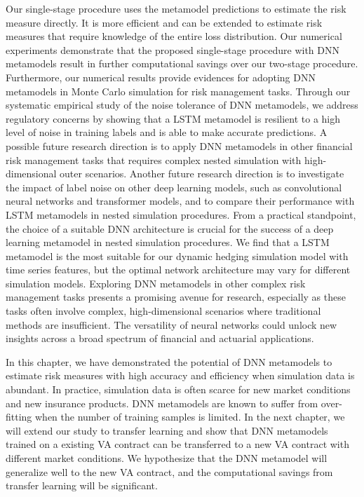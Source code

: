 Our single-stage procedure uses the metamodel predictions to estimate the risk measure directly.
It is more efficient and can be extended to estimate risk measures that require knowledge of the entire loss distribution.
Our numerical experiments demonstrate that the proposed single-stage procedure with DNN metamodels result in further computational savings over our two-stage procedure. 
Furthermore, our numerical results provide evidences for adopting DNN metamodels in Monte Carlo simulation for risk management tasks.
Through our systematic empirical study of the noise tolerance of DNN metamodels, we address regulatory concerns by showing that a LSTM metamodel is resilient to a high level of noise in training labels and is able to make accurate predictions.
A possible future research direction is to apply DNN metamodels in other financial risk management tasks that requires complex nested simulation with high-dimensional outer scenarios.
Another future research direction is to investigate the impact of label noise on other deep learning models, such as convolutional neural networks and transformer models, and to compare their performance with LSTM metamodels in nested simulation procedures. 
From a practical standpoint, the choice of a suitable DNN architecture is crucial for the success of a deep learning metamodel in nested simulation procedures.
We find that a LSTM metamodel is the most suitable for our dynamic hedging simulation model with time series features, but the optimal network architecture may vary for different simulation models.
Exploring DNN metamodels in other complex risk management tasks presents a promising avenue for research, especially as these tasks often involve complex, high-dimensional scenarios where traditional methods are insufficient. 
The versatility of neural networks could unlock new insights across a broad spectrum of financial and actuarial applications.

In this chapter, we have demonstrated the potential of DNN metamodels to estimate risk measures with high accuracy and efficiency when simulation data is abundant.
In practice, simulation data is often scarce for new market conditions and new insurance products.
DNN metamodels are known to suffer from over-fitting when the number of training samples is limited.
In the next chapter, we will extend our study to transfer learning and show that DNN metamodels trained on a existing VA contract can be transferred to a new VA contract with different market conditions.
We hypothesize that the DNN metamodel will generalize well to the new VA contract, and the computational savings from transfer learning will be significant.